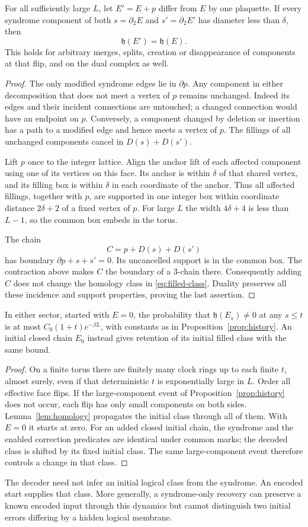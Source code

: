 \begin{lemma}\label{lem:homology}
For all sufficiently large \(L\), let \(E'=E+p\) differ from \(E\)
by one plaquette. If every syndrome component of both
\(s=\partial_2E\) and \(s'=\partial_2E'\) has diameter less than
\(\delta\), then
\[
 \mathfrak h(E')=\mathfrak h(E).
\]
This holds for arbitrary merges, splits, creation or disappearance
of components at that flip, and on the dual complex as well.
\end{lemma}
\begin{proof}
The only modified syndrome edges lie in \(\partial p\).
Any component in either decomposition that does not meet a vertex
of \(p\) remains unchanged. Indeed its edges and their incident
connections are untouched; a changed connection would have an
endpoint on \(p\). Conversely, a component changed by deletion or
insertion has a path to a modified edge and hence meets a vertex
of \(p\). The fillings of all unchanged components cancel in
\(D(s)+D(s')\).

Lift \(p\) once to the integer lattice. Align the anchor lift of
each affected component using one of its vertices on this face.
Its anchor is within \(\delta\) of that shared vertex, and its
filling box is within \(\delta\) in each coordinate of the anchor.
Thus all affected fillings, together with \(p\), are supported in
one integer box within coordinate distance \(2\delta+2\) of a fixed
vertex of \(p\). For large \(L\) the width \(4\delta+4\) is less
than \(L-1\), so the common box embeds in the torus.

The chain
\[
 C=p+D(s)+D(s')
\]
has boundary \(\partial p+s+s'=0\). Its uncancelled support is in
the common box. The contraction above makes \(C\) the boundary of
a 3-chain there. Consequently adding \(C\) does not change the
homology class in \eqref{eq:filled-class}. Duality preserves all
these incidence and support properties, proving the last assertion.
\end{proof}

\begin{corollary}\label{cor:retention}
In either sector, started with \(E=0\), the probability that
\(\mathfrak h(E_s)\ne0\) at any \(s\le t\) is at most
\(C_0(1+t)e^{-\beta L}\), with constants as in
Proposition~\ref{prop:history}. An initial closed chain \(E_0\)
instead gives retention of its initial filled class with the same
bound.
\end{corollary}
\begin{proof}
On a finite torus there are finitely many clock rings up to each
finite \(t\), almost surely, even if that deterministic \(t\) is
exponentially large in \(L\). Order all effective face flips.
If the large-component event of
Proposition~\ref{prop:history} does not occur, each flip has only
small components on both sides. Lemma~\ref{lem:homology} propagates
the initial class through all of them. With \(E=0\) it starts at
zero. For an added closed initial chain, the syndrome and the
enabled correction predicates are identical under common marks;
the decoded class is shifted by its fixed initial class. The same
large-component event therefore controls a change in that class.
\end{proof}

The decoder need not infer an initial logical class from the
syndrome. An encoded start supplies that class. More generally, a
syndrome-only recovery can preserve a known encoded input through
this dynamics but cannot distinguish two initial errors differing
by a hidden logical membrane.
